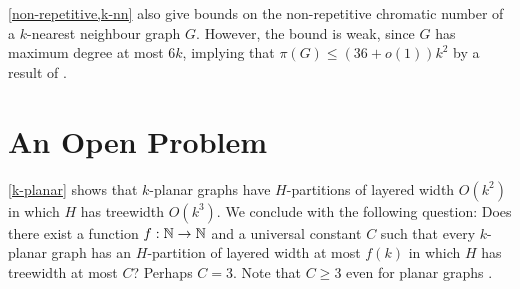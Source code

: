 \documentclass{patmorin}
\renewcommand{\geq}{\geqslant}
\renewcommand{\leq}{\leqslant}
\begin{document}
\cref{non-repetitive,k-nn} also give bounds on the non-repetitive chromatic number of a $k$-nearest neighbour graph $G$. However, the bound is weak, since $G$ has maximum degree at most $6k$, implying that $\pi(G) \leq (36+o(1))k^2$ by a result of \citet{DJKW16}.


\section{An Open Problem}

\cref{k-planar} shows that $k$-planar graphs have $H$-partitions of layered width $O(k^2)$ in which $H$ has treewidth $O(k^3)$.  We conclude with the following question:  Does there exist a function $f:\mathbb{N}\to\mathbb{N}$ and a universal constant $C$ such that every $k$-planar graph has an $H$-partition of layered width at most $f(k)$ in which $H$ has treewidth at most $C$?  Perhaps $C=3$. Note that $C\geq 3$ even for planar graphs \citep{dujmovic.joret.ea:planar}.  




\end{document}
